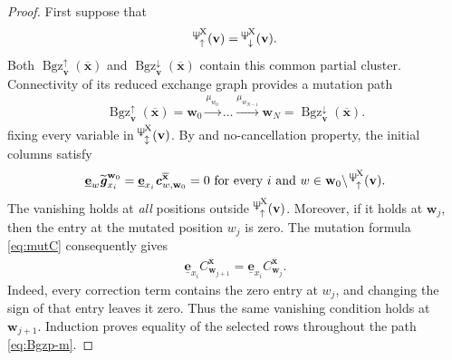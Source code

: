 \documentclass[11pt,reqno]{amsart}
\newcommand{\Neptune}{\mathord{\text{\tikz[baseline=-.5ex,scale=.13]{\draw[line width=.45pt] (0,0)--(0,1.8) (-.6,1.8)--(-.6,.8)--(.6,.8)--(.6,1.8) (-.35,.35)--(.35,.35);}}}}
\theoremstyle{plain}
\theoremstyle{definition}
\numberwithin{equation}{section}
\newcommand\<{\langle}
\renewcommand\>{\rangle}
\def\ww{\mathbf{w}}
\def\vv{\mathbf{v}}
\def\sink{X}
\newcommand{\ccpt}[1]{\mathrm{#1}}%
\def\xevo{\ccpt{X}}%
\newcommand{\bfit}[1]{\textbf{\textit{#1}}}
\newcommand{\ubf}[1]{\underline{\mathbf{#1}}}
\def\xx{\mathbf{x}}%
\def\cvec{\bfit{c}}
\def\gvec{\bfit{g}}
\def\Cmat{{C}}
\newcommand{\Bgzp}[2]{\operatorname{Bgz}^{\uparrow}_{#2}(#1)}
\newcommand{\Bgzm}[2]{\operatorname{Bgz}^{\downarrow}_{#2}(#1)}
\newcommand{\suppd}[1]{\operatorname{\Neptune}_{\downarrow}^{#1}}
\newcommand{\suppu}[1]{\operatorname{\Neptune}_{\uparrow}^{#1}}
\newcommand{\suppdu}[1]{\operatorname{\Neptune}_{\updownarrow}^{#1}}
\newcommand{\ol}[1]{\overline{#1}}
\def\tgvec{\widetilde{\gvec}}
\begin{document}
\begin{proof}
First suppose that 
\[
\suppu{\xevo}(\vv)=\suppd{\xevo}(\vv).
\]
Both $\Bgzp{\ol{\xx}}{\vv}$ and $\Bgzm{\ol{\xx}}{\vv}$ contain this common partial cluster.
Connectivity of its reduced exchange graph provides a mutation path
\begin{gather}\label{eq:Bgzp-m}
    \Bgzp{\ol{\xx}}{{\vv}}=
    \ww_0\xrightarrow{\mu_{w_0}}\ldots\xrightarrow{\mu_{w_{N-1}}}\ww_N=\Bgzm{\ol{\xx}}{\vv}.
\end{gather}
fixing every variable in $\suppdu{\xevo}(\vv)$.
By  and no-cancellation property, the initial columns satisfy
\begin{gather}
    \ubf{e}_{w}\tgvec^{\ww_0}_{x_i}=
    \ubf{e}_{x_i}\cvec^{\ol{\xx}}_{w,\ww_0}=0~\text{for every}~i~\text{and}~w\in\ww_0\backslash\suppu{\xevo}(\vv).
\end{gather}
The vanishing holds at \emph{all} positions outside $\suppu{\xevo}(\vv)$.
Moreover, if it holds at $\ww_j$, then the entry at the mutated position $w_j$ is zero.
The mutation formula \eqref{eq:mutC} consequently gives
\begin{gather}
    \ubf{e}_{x_i}\Cmat^{\ol{\xx}}_{\ww_{j+1}}=\ubf{e}_{x_i}\Cmat^{\ol{\xx}}_{\ww_j}.
\end{gather}
Indeed, every correction term contains the zero entry at $w_j$, and changing the sign of that entry leaves it zero. 
Thus the same vanishing condition holds at $\ww_{j+1}$.
Induction proves equality of the selected rows throughout the path \eqref{eq:Bgzp-m}.


\end{proof}
\end{document}
